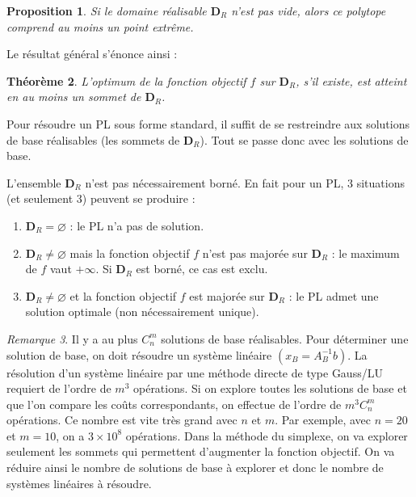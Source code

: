 \documentclass[a4paper,12pt,openany]{book}
\theoremstyle{plain}
\newtheorem{theorem}{Théorème}[section]
\newtheorem{proposition}[theorem]{Proposition}
\theoremstyle{definition}
\theoremstyle{remark}
\newtheorem{remarque}[theorem]{Remarque}
\theoremstyle{nbstyle}
\begin{document}
	\begin{proposition}
		Si le domaine réalisable $\mathbf{D}_{R}$ n'est pas vide, alors ce polytope comprend au moins un point extrême.
	\end{proposition}
	\label{prop:2.2}
	
	Le résultat général s'énonce ainsi :
	
	\begin{theorem}
		L'optimum de la fonction objectif $f$ sur $\mathbf{D}_{R}$, s'il existe, est atteint en au moins un sommet de $\mathbf{D}_{R}$.
	\end{theorem}
	\label{thm:2.2}
	
	
	Pour résoudre un PL sous forme standard, il suffit de se restreindre aux solutions de base réalisables (les sommets de $\mathbf{D}_{R}$). Tout se passe donc avec les solutions de base.
	
	L'ensemble $\mathbf{D}_{R}$ n'est pas nécessairement borné. En fait pour un PL, 3 situations (et seulement 3) peuvent se produire :
	
	\begin{enumerate}
		\item $\mathbf{D}_{R} = \varnothing$ : le PL n'a pas de solution.
		\item $\mathbf{D}_{R} \neq \varnothing$ mais la fonction objectif $f$ n'est pas majorée sur $\mathbf{D}_{R}$ : le maximum de $f$ vaut $+\infty$. Si $\mathbf{D}_{R}$ est borné, ce cas est exclu.
		\item $\mathbf{D}_{R} \neq \varnothing$ et la fonction objectif $f$ est majorée sur $\mathbf{D}_{R}$ : le PL admet une solution optimale (non nécessairement unique).
	\end{enumerate}
	
	\begin{remarque}
		Il y a au plus $C_{n}^{m}$ solutions de base réalisables. Pour déterminer une solution de base, on doit résoudre un système linéaire $(x_{B} = A_{B}^{-1} b)$. La résolution d'un système linéaire par une méthode directe de type Gauss/LU requiert de l'ordre de $m^{3}$ opérations. Si on explore toutes les solutions de base et que l'on compare les coûts correspondants, on effectue de l'ordre de $m^{3} C_{n}^{m}$ opérations. Ce nombre est vite très grand avec $n$ et $m$. Par exemple, avec $n=20$ et $m=10$, on a $3 \times 10^{8}$ opérations. Dans la méthode du simplexe, on va explorer seulement les sommets qui permettent d'augmenter la fonction objectif. On va réduire ainsi le nombre de solutions de base à explorer et donc le nombre de systèmes linéaires à résoudre.
	\end{remarque}
	\label{rem:2.6}
	
\end{document}
